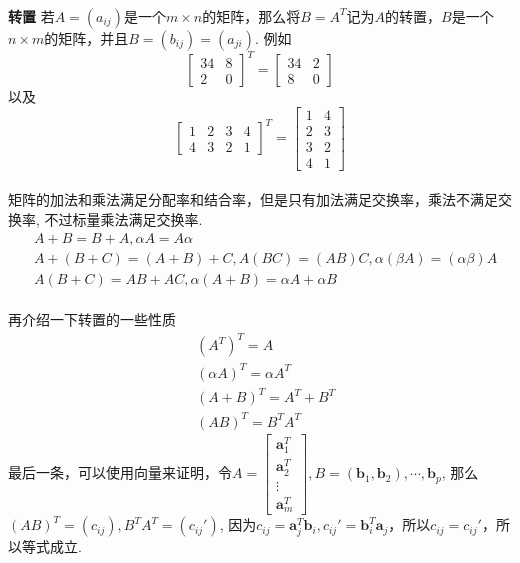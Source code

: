 \paragraph{}
\textbf{转置} \:  若$A = (a_{ij})$是一个$m\times n$的矩阵，那么将$B = A^T$记为$A$的转置，$B$是一个$n \times m$的矩阵，并且$B = (b_{ij}) = (a_{ji})$. 例如
$$
\begin{bmatrix}
    34 & 8 \\
    2 & 0
  \end{bmatrix}^T = 
  \begin{bmatrix}
    34 & 2 \\
    8 & 0
  \end{bmatrix}
$$
以及
$$
\begin{bmatrix}
    1 & 2 & 3 & 4\\
    4 & 3  & 2 & 1
  \end{bmatrix}^T = 
  \begin{bmatrix}
    1 & 4 \\
    2 & 3 \\
    3 & 2 \\
    4 & 1
  \end{bmatrix}
$$

\paragraph{}
矩阵的加法和乘法满足分配率和结合率，但是只有加法满足交换率，乘法不满足交换率, 不过标量乘法满足交换率. 
\begin{align*}
& A + B  = B + A, \alpha A = A \alpha \\
& A + (B + C) = (A + B) + C, A(BC) = (AB)C, \alpha (\beta A) = (\alpha \beta) A\\
& A (B + C) = AB + AC, \alpha (A + B) = \alpha A + \alpha B
\end{align*}

\paragraph{}
再介绍一下转置的一些性质
\begin{align*}
& (A^T)^T = A \\
& (\alpha A)^T = \alpha A^T \\
& (A + B)^T = A^T + B^T \\
& (AB)^T = B^T A^T
\end{align*}
最后一条，可以使用向量来证明，令$A =  \begin{bmatrix}
    \textbf{a}_1^T\\
    \textbf{a}_2^T\\
    \vdots \\
     \textbf{a}_m^T
  \end{bmatrix}, B = (\textbf{b}_1, \textbf{b}_2), \cdots, \textbf{b}_p$, 那么$(AB)^T = (c_{ij}), B^T A^T = (c_{ij}')$, 因为$c_{ij} = \textbf{a}_j^T \textbf{b}_i, c_{ij}' = \textbf{b}_i^T \textbf{a}_j$，所以$c_{ij} = c_{ij}'$，所以等式成立.

